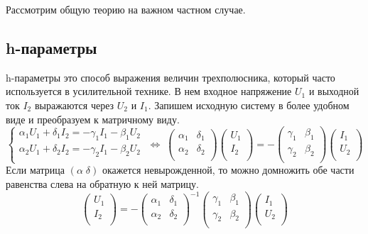 \documentclass[11pt,a4paper]{article}
\begin{document}
Рассмотрим общую теорию на важном частном случае.
\subsection*{h-параметры}
h-параметры это способ выражения величин трехполюсника, который часто используется в усилительной технике. В нем входное 
напряжение $U_1$ и выходной ток $I_2$ выражаются через $U_2$ и $I_1$. Запишем исходную систему в более удобном виде и 
преобразуем к матричному виду.
$$
\begin{cases}
\alpha_1U_1 + \delta_1I_2 = -\gamma_1I_1 -\beta_1U_2 \\
\alpha_2U_1 + \delta_2I_2 = -\gamma_2I_1 -\beta_2U_2 \\
\end{cases}
\; \Leftrightarrow \;
\begin{pmatrix}
\alpha_1 & \delta_1 \\ \alpha_2 & \delta_2\\
\end{pmatrix}
\begin{pmatrix} U_1\\ I_2\\\end{pmatrix}
=-
\begin{pmatrix}
\gamma_1 & \beta_1 \\ \gamma_2 & \beta_2\\
\end{pmatrix}
\begin{pmatrix} I_1\\ U_2\\\end{pmatrix}
$$
Если матрица $(\alpha \; \delta)$ окажется невырожденной, то можно домножить обе части равенства слева на обратную к ней матрицу.
$$
\begin{pmatrix} U_1\\ I_2\\\end{pmatrix}
=-
\begin{pmatrix}
\alpha_1 & \delta_1 \\ \alpha_2 & \delta_2\\
\end{pmatrix}^{-1}
\begin{pmatrix}
\gamma_1 & \beta_1 \\ \gamma_2 & \beta_2\\
\end{pmatrix}
\begin{pmatrix} I_1\\ U_2\\\end{pmatrix}
$$
\end{document}
